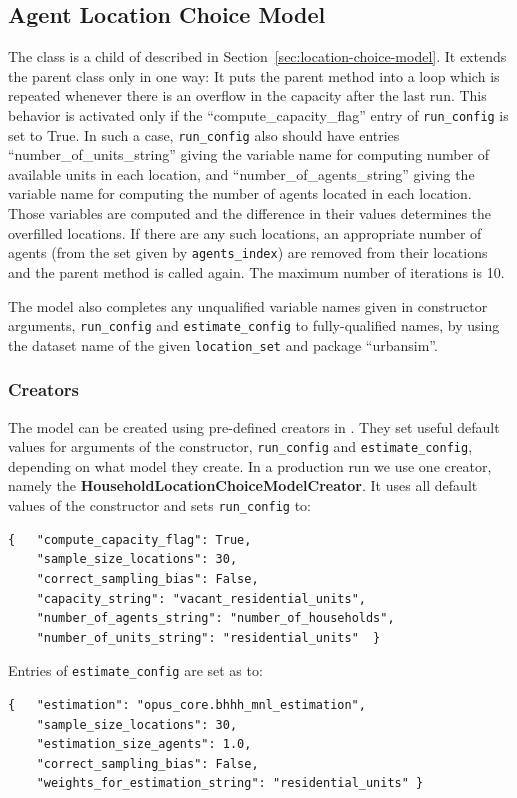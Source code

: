 %
\subsection{Agent Location Choice Model}
\modelsindex
%
\label{sec:agent-lcm}

The class  is a child
of  described in
Section~\ref{sec:location-choice-model}. It extends the
parent class only in one way: It puts the parent method
 into a loop which is repeated whenever there is an
overflow in the capacity after the last run. This behavior is
activated only if the ``compute_capacity_flag'' entry of
\verb|run_config| is set to True. In such a case, \verb|run_config|
also should have entries ``number_of_units_string'' giving the
variable name for computing number of available
units in each location, and ``number_of_agents_string'' giving the
variable name for computing the number of agents
located in each location. Those variables are
computed and the difference in their values determines the
overfilled locations. If there are any such locations, an
appropriate number of agents (from the set given by
\verb|agents_index|) are removed from their locations and the parent
 method is called again. The maximum number of
iterations is 10.

The model also completes any unqualified variable names given in constructor
arguments, \verb|run_config| and \verb|estimate_config| to fully-qualified
names, by using the dataset name of the given \verb|location_set| and package
``urbansim''.

\subsubsection{Creators}
The model can be created using pre-defined creators in .
They set useful default values for arguments of the
 constructor, \verb|run_config| and
\verb|estimate_config|, depending on what model they create. In a production run we use one creator, namely the
{\bf HouseholdLocationChoiceModelCreator}.  It uses all default
  values of the  constructor and sets
  \verb|run_config| to:
\begin{verbatim}
{   "compute_capacity_flag": True,
    "sample_size_locations": 30,
    "correct_sampling_bias": False,
    "capacity_string": "vacant_residential_units",
    "number_of_agents_string": "number_of_households",
    "number_of_units_string": "residential_units"  }
\end{verbatim}
Entries of \verb|estimate_config| are set as to:
\begin{verbatim}
{   "estimation": "opus_core.bhhh_mnl_estimation",
    "sample_size_locations": 30,
    "estimation_size_agents": 1.0,
    "correct_sampling_bias": False,
    "weights_for_estimation_string": "residential_units" }
\end{verbatim}

